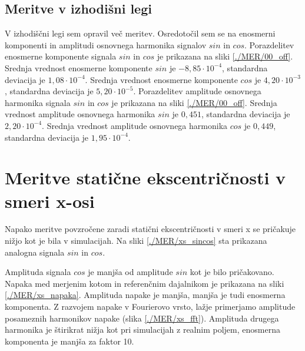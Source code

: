\subsection{Meritve v izhodišni legi}
V izhodiščni legi sem opravil več meritev. Osredotočil sem se na enosmerni komponenti  in amplitudi osnovnega harmonika signalov $sin$ in $cos$. 
Porazdelitev enosmerne komponente signala $sin$ in $cos$ je prikazana na sliki \ref{./MER/00_off}.
Srednja vrednost enosmerne komponente $sin$ je $-8,85 \cdot 10^{-4}$, standardna deviacija je $1,08\cdot 10^{-4}$.
Srednja vrednost enosmerne komponente $cos$ je $4,20 \cdot 10^{-3}$, standardna deviacija je $5,20\cdot 10^{-5}$.
Porazdelitev amplitude osnovnega harmonika signala $sin$ in $cos$ je prikazana na sliki \ref{./MER/00_off}.
Srednja vrednost amplitude osnovnega harmonika $sin$ je $0,451$, standardna deviacija je $2,20\cdot 10^{-4}$.
Srednja vrednost amplitude osnovnega harmonika $cos$ je $0,449$, standardna deviacija je $1,95\cdot 10^{-4}$.

\section{Meritve statične ekscentričnosti v smeri x-osi}

Napako meritve povzročene zaradi statični ekscentričnosti v smeri x se pričakuje nižjo kot je bila v simulacijah. Na sliki \ref{./MER/xs_sincos} sta prikazana analogna signala $sin$ in $cos$. 


Amplituda signala $cos$ je manjša od amplitude $sin$ kot je bilo pričakovano. Napaka med merjenim kotom in referenčnim dajalnikom je prikazana na sliki \ref{./MER/xs_napaka}. Amplituda napake je manjša, manjša je tudi enosmerna komponenta. Z razvojem napake v Fourierovo vrsto, lažje primerjamo amplitude posameznih harmonikov napake (slika \ref{./MER/xs_fft}). Amplituda drugega harmonika je štirikrat nižja kot pri simulacijah z realnim poljem, enosmerna komponenta je manjša za faktor 10.





